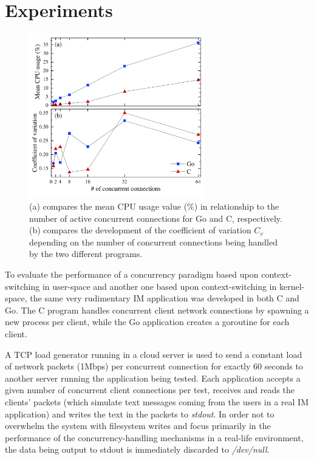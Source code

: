 \section{Experiments}
\begin{figure}[!t]
	\centering
	\includegraphics[width=3in]{img/experiments.pdf}
	\caption{(a) compares the mean CPU usage value (\%) in relationship to the number of active concurrent connections for Go and C, respectively. (b) compares the development of the coefficient of variation $C_v$ depending on the number of concurrent connections being handled by the two different programs.}
	\label{fig_results}
\end{figure}
To evaluate the performance of a concurrency paradigm based upon context-switching in user-space and another one based upon context-switching in kernel-space, the same very rudimentary IM application was developed in both C and Go. The C program handles concurrent client network connections by spawning a new process per client, while the Go application creates a goroutine for each client. 

A TCP load generator running in a cloud server is used to send a constant load of network packets (1Mbps) per concurrent connection for exactly 60 seconds to another server running the application being tested. Each application accepts a given number of concurrent client connections per test, receives and reads the clients' packets (which simulate text messages coming from the users in a real IM application) and writes the text in the packets to \textit{stdout}. In order not to overwhelm the system with filesystem writes and focus primarily in the performance of the concurrency-handling mechanisms in a real-life environment, the data being output to stdout is immediately discarded to \textit{/dev/null}. 

